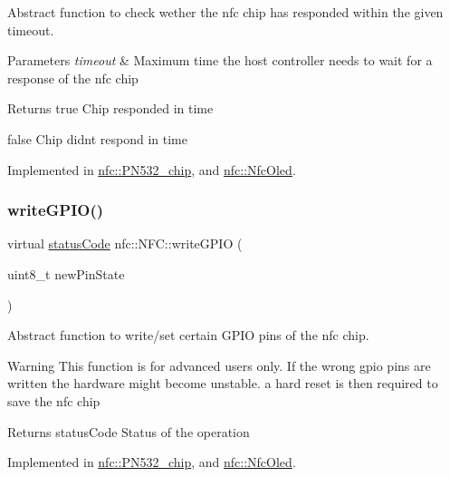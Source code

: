 Abstract function to check wether the nfc chip has responded within the given timeout. 


\begin{DoxyParams}{Parameters}
{\em timeout} & Maximum time the host controller needs to wait for a response of the nfc chip \\
\hline
\end{DoxyParams}
\begin{DoxyReturn}{Returns}
true Chip responded in time 

false Chip didnt respond in time 
\end{DoxyReturn}


Implemented in \hyperlink{classnfc_1_1PN532__chip_a10aa275adf2ddbcb6db5afa5666a9594}{nfc\+::\+P\+N532\+\_\+chip}, and \hyperlink{classnfc_1_1NfcOled_aed3fb53e82dba1bbdc97adb38d6fdb29}{nfc\+::\+Nfc\+Oled}.

\mbox{\label{classnfc_1_1NFC_a606b08348cb8176a38b2dd9fc1136888}} 
\subsubsection{\texorpdfstring{write\+G\+P\+I\+O()}{writeGPIO()}}
{\footnotesize\ttfamily virtual \hyperlink{declarations_8h_ae1d20c5a38cae82ccaa6a77be3fd264b}{status\+Code} nfc\+::\+N\+F\+C\+::write\+G\+P\+IO (\begin{DoxyParamCaption}\item[{uint8\+\_\+t}]{new\+Pin\+State }\end{DoxyParamCaption})\hspace{0.3cm}{\ttfamily [pure virtual]}}



Abstract function to write/set certain G\+P\+IO pins of the nfc chip. 

\begin{DoxyWarning}{Warning}
This function is for advanced users only. If the wrong gpio pins are written the hardware might become unstable. a hard reset is then required to save the nfc chip 
\end{DoxyWarning}
\begin{DoxyReturn}{Returns}
status\+Code Status of the operation 
\end{DoxyReturn}


Implemented in \hyperlink{classnfc_1_1PN532__chip_ad33f6bf96640bf7b10407e735ca57e2a}{nfc\+::\+P\+N532\+\_\+chip}, and \hyperlink{classnfc_1_1NfcOled_a93a2097132e92d3bc6f1e1c4c45d364b}{nfc\+::\+Nfc\+Oled}.

